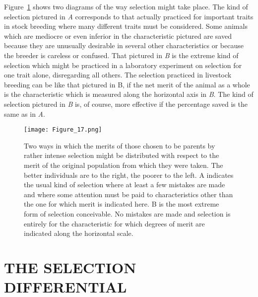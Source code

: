 Figure~\ref{fig:Lush_Figure_17} shows two diagrams of the way selection might
take place. The kind of selection pictured in \textit{A} corresponds to that actually
practiced for important traits in stock breeding where many different
traits must be considered. Some animals which are mediocre or even
inferior in the characteristic pictured are saved because they are unusually
desirable in several other characteristics or because the breeder is
careless or confused. That pictured in \textit{B} is the extreme kind of selection
which might be practiced in a laboratory experiment on selection for
one trait alone, disregarding all others. The selection practiced in livestock
breeding can be like that pictured in B, if the net merit of the animal
as a whole is the characteristic which is measured along the horizontal
axis in \textit{B}. The kind of selection pictured in \textit{B} is, of course, more
effective if the percentage saved is the same as in \textit{A}.

\begin{figure}
	\centering
    \texttt{[image: Figure\_17.png]}
    \caption{Two ways in which the merits of those chosen to be parents by rather
			 intense selection might be distributed with respect to the merit of the original population
			 from which they were taken. The better individuals are to the right, the poorer
			 to the left. A indicates the usual kind of selection where at least a few mistakes are
			 made and where some attention must be paid to characteristics other than the one
			 for which merit is indicated here. B is the most extreme form of selection conceivable.
			 No mistakes are made and selection is entirely for the characteristic for which
			 degrees of merit are indicated along the horizontal scale.}
    \label{fig:Lush_Figure_17}
\end{figure}

\section*{THE SELECTION DIFFERENTIAL}


